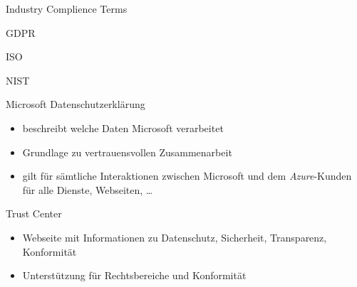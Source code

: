 
\begin{flashcard}[Understand]{Industry Complience Terms}

\end{flashcard}

\begin{flashcard}[Understand]{GDPR}

\end{flashcard}

\begin{flashcard}[Describe]{ISO}

\end{flashcard}

\begin{flashcard}[Describe]{NIST}

\end{flashcard}

\begin{flashcard}[\ ]{Microsoft Datenschutzerklärung}
    \begin{itemize}
        \item beschreibt welche Daten Microsoft verarbeitet
        \item Grundlage zu vertrauensvollen Zusammenarbeit
        \item gilt für sämtliche Interaktionen zwischen Microsoft und dem \emph{Azure}-Kunden für alle Dienste, Webseiten, \ldots
    \end{itemize}
\end{flashcard}

\begin{flashcard}[Definition]{Trust Center}
    \begin{itemize}
        \item Webseite mit Informationen zu Datenschutz, Sicherheit, Transparenz, Konformität
        \item Unterstützung für Rechtsbereiche und Konformität
    \end{itemize}
\end{flashcard}

